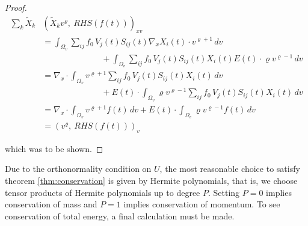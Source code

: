 \begin{proof}
    \begin{equation}
        \begin{split}
            \sum_k \widetilde{ X }_k &
            \left( \widetilde{ X }_k v^\varrho,\ 
                RHS ( f(t) ) \right)_{x v} \\
            &= \int_{\Omega_v} \sum_{i j} 
                f_0\, V_j (t) S_{i j} (t) \nabla_x X_i (t) \cdot v^{\varrho + 1} \,dv \\ 
                &\quad\quad\quad\quad\quad\quad\quad%
                + \int_{\Omega_v} \sum_{i j} 
                f_0\, V_j (t) S_{i j} (t) X_i (t) E(t) \cdot \varrho v^{\varrho - 1} \,dv \\ 
            &= \nabla_x \cdot \int_{\Omega_v} v^{\varrho + 1} 
                \sum_{i j} f_0\, V_j (t) S_{i j} (t) X_i (t) \,dv \\ 
                &\quad\quad\quad\quad\quad\quad\quad%
                + E(t) \cdot \int_{\Omega_v} \varrho v^{\varrho - 1} 
                \sum_{i j} f_0\, V_j (t) S_{i j} (t) X_i (t) \,dv \\ 
            &= \nabla_x \cdot \int_{\Omega_v} v^{\varrho + 1} f(t) \,dv
                + E(t) \cdot \int_{\Omega_v} \varrho v^{\varrho - 1} f(t) \,dv \\ 
            &= \left( v^\varrho,\ RHS(f(t)) \right)_v
        \end{split}
    \end{equation}

    which was to be shown. 
    \fi
\end{proof}

Due to the orthonormality condition on $U$, the most reasonable choice to satisfy theorem 
\ref{thm:conservation} is given by Hermite polynomials, that is, we choose tensor 
products of Hermite polynomials up to degree $P$. Setting $P = 0$ implies conservation of 
mass and $P = 1$ implies conservation of momentum. To see conservation of total energy, 
a final calculation must be made. 

